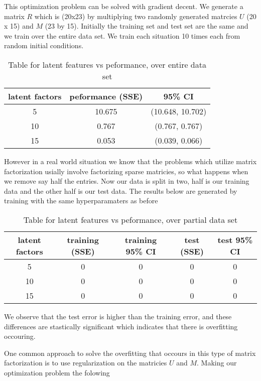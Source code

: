 \documentclass{article}
\begin{document}
This optimization problem can be solved with gradient decent. We generate a matrix $R$ which is (20x23) by multiplying two randomly generated matrcies $U$ (20 x 15) and $M$ (23 by 15). Initially the training set and test set are the same and we train over the entire data set. We train each situation 10 times each from random initial conditions.

\begin{table}[H]
\centering
\begin{tabular}{| c | c | c |}
\hline
latent factors & peformance (SSE) & 95\% CI \\
\hline
\hline
5 & 10.675 & (10.648, 10.702)\\
10 & 0.767 & (0.767, 0.767)\\
15 & 0.053 & (0.039, 0.066) \\
\hline
\end{tabular}
\caption{Table for latent features vs peformance, over entire data set}
\end{table}

However in a real world situation we know that the problems which utilize matrix factorization usially involve factorizing sparse matricies, so what happens when we remove say half the entries. Now our data is split in two, half is our training data and the other half is our test data. The results below are generated by training with the same hyperparamaters as before

\begin{table}[H]
\centering
\begin{tabular}{| c | c | c | c | c |}
\hline
latent factors & training (SSE) &  training 95\% CI & test (SSE) &  test 95\% CI  \\
\hline
\hline
5 & 0 & 0 & 0 & 0\\
10 & 0 & 0 & 0 & 0\\
15 & 0 & 0 & 0 & 0\\
\hline
\end{tabular}
\caption{Table for latent features vs peformance, over partial data set}
\end{table}

We observe that the test error is higher than the training error, and these differences are stastically significant which indicates that there is overfitting occouring.

One common approach to solve the overfitting that occours in this type of matrix factorization is to use regularization on the matricies $U$ and $M$. Making our optimization problem the folowing
\end{document}
